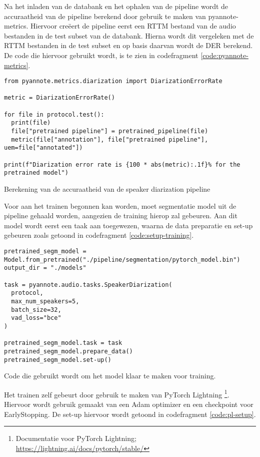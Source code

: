 Na het inladen van de databank en het ophalen van de pipeline wordt de accuraatheid van de pipeline berekend door gebruik te maken van pyannote-metrics. Hiervoor creëert de pipeline eerst een RTTM bestand van de audio bestanden in de test subset van de databank. Hierna wordt dit vergeleken met de RTTM bestanden in de test subset en op basis daarvan wordt de DER berekend. De code die hiervoor gebruikt wordt, is te zien in codefragment \ref{code:pyannote-metrics}.

\begin{listing}
\begin{verbatim}
from pyannote.metrics.diarization import DiarizationErrorRate

metric = DiarizationErrorRate()

for file in protocol.test():
  print(file)
  file["pretrained pipeline"] = pretrained_pipeline(file)
  metric(file["annotation"], file["pretrained pipeline"], uem=file["annotated"])

print(f"Diarization error rate is {100 * abs(metric):.1f}% for the pretrained model")
\end{verbatim}
	\caption[Berekening DER met pyannote-metrics]{\label{code:pyannote-metrics}Berekening van de accuraatheid van de speaker diarization pipeline}
\end{listing}

Voor aan het trainen begonnen kan worden, moet segmentatie model uit de pipeline gehaald worden, aangezien de training hierop zal gebeuren. Aan dit model wordt eerst een taak aan toegewezen, waarna de data preparatie en set-up gebeuren zoals getoond in codefragment \ref{code:setup-training}.

\begin{listing}
	\begin{verbatim}
pretrained_segm_model = Model.from_pretrained("./pipeline/segmentation/pytorch_model.bin")
output_dir = "./models"

task = pyannote.audio.tasks.SpeakerDiarization(
  protocol,
  max_num_speakers=5,
  batch_size=32,
  vad_loss="bce"
)

pretrained_segm_model.task = task
pretrained_segm_model.prepare_data()
pretrained_segm_model.set-up()
	\end{verbatim}
	\caption[Model klaarmaken voor training]{\label{code:setup-training}Code die gebruikt wordt om het model klaar te maken voor training.}
\end{listing}

Het trainen zelf gebeurt door gebruik te maken van PyTorch Lightning \footnote{Documentatie voor PyTorch Lightning; \url{https://lightning.ai/docs/pytorch/stable/}}. Hiervoor wordt gebruik gemaakt van een Adam optimizer en een checkpoint voor EarlyStopping. De set-up hiervoor wordt getoond in codefragment \ref{code:pl-setup}.

